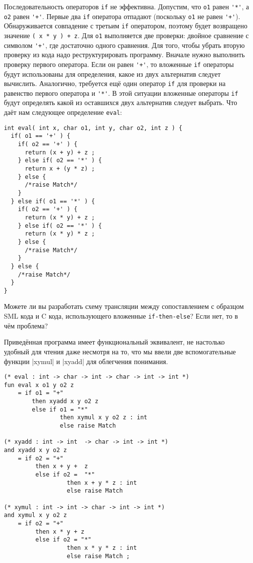 Последовательность операторов \lstinline|if| не эффективна. Допустим, что \lstinline|o1| равен \lstinline|'*'|, а \lstinline|o2| равен \lstinline|'+'|. Первые два \lstinline|if| оператора отпадают (поскольку \lstinline|o1| не равен \lstinline|'+'|). Обнаруживается совпадение с третьим \lstinline|if| оператором, поэтому будет возвращено значение \lstinline|( x * y ) + z|. Для \lstinline|o1| выполняется две проверки: двойное сравнение с символом \lstinline|'+'|, где достаточно одного сравнения. Для того, чтобы убрать вторую проверку из кода надо реструктурировать программу. Вначале нужно выполнить проверку первого оператора. Если он равен \lstinline|'+'|, то вложенные \lstinline|if| операторы будут использованы для определения, какое из двух альтернатив следует вычислить. Аналогично, требуется ещё один оператор \lstinline|if| для проверки на равенство первого оператора и \lstinline|'*'|. В этой ситуации вложенные операторы \lstinline|if| будут определять какой из оставшихся двух альтернатив следует выбрать. Что даёт нам следующее определение \lstinline|eval|:

\begin{lstlisting}
int eval( int x, char o1, int y, char o2, int z ) {
  if( o1 == '+' ) {
    if( o2 == '+' ) {
      return (x + y) + z ;
    } else if( o2 == '*' ) {
      return x + (y * z) ;
    } else {
      /*raise Match*/
    }
  } else if( o1 == '*' ) {
    if( o2 == '+' ) {
      return (x * y) + z ;
    } else if( o2 == '*' ) {
      return (x * y) * z ;
    } else {
      /*raise Match*/
    }
  } else {
    /*raise Match*/
  }
}
\end{lstlisting}

\exercise Можете ли вы разработать схему трансляции между сопоставлением с образцом SML кода и C кода, использующего вложенные \lstinline|if-then-else|? Если нет, то в чём проблема?\label{ex_2.4}

Приведённая программа имеет функциональный эквивалент, не настолько удобный для чтения даже несмотря на то, что мы ввели две вспомогательные функции \inline|xymul| и \inline|xyadd| для облегчения понимания.

\begin{lstlisting}[style=customml]
(* eval : int -> char -> int -> char -> int -> int *)
fun eval x o1 y o2 z
    = if o1 = "+"
        then xyadd x y o2 z
        else if o1 = "*"
                then xymul x y o2 z : int
                else raise Match

(* xyadd : int -> int  -> char -> int -> int *)
and xyadd x y o2 z
    = if o2 = "+"
         then x + y +  z
         else if o2 =  "*"
                  then x + y * z : int
                  else raise Match

(* xymul : int -> int -> char -> int -> int *)
and xymul x y o2 z
    = if o2 = "+"
         then x * y + z
         else if o2 = "*"
                  then x * y * z : int
                  else raise Match ;
\end{lstlisting}

